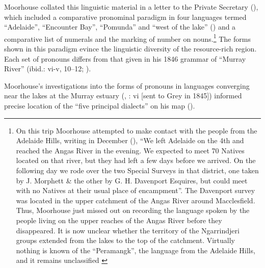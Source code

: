 Moorhouse collated this linguistic material in a letter to the Private Secretary (\citeyear{moorhouse_letter_1840}), which included a comparative pronominal paradigm in four languages termed “Adelaide'', ``Encounter Bay'', “Pomunda” and “west of the lake” () and a comparative list of numerals and the marking of number on nouns.\footnote{{On this trip Moorhouse attempted to make contact with the people from the Adelaide Hills, writing in December (\citeyear{moorhouse_letter_1840}), “We left Adelaide on the 4th and reached the Angas River in the evening. We expected to meet 70 Natives located on that river, but they had left a few days before we arrived. On the following day we rode over the two Special Surveys in that district, one taken by J. Morphett \& the other by G. H. Davenport Esquires, but could meet with no Natives at their usual place of encampment”. The Davenport survey was located in the upper catchment of the Angas River around Macclesfield. Thus, Moorhouse just missed out on recording the language spoken by the people living on the upper reaches of the Angas River before they disappeared. It is now unclear whether the territory of the Ngarrindjeri groups extended from the lakes to the top of the catchment. Virtually nothing is known of the ``Peramangk'', the language from the Adelaide Hills, and it remains unclassified \citep[170]{simpson_early_1996}}} The forms shown in this paradigm evince the linguistic diversity of the resource-rich region. Each set of pronouns differs from that given in his 1846 grammar of “Murray River” (ibid.: vi-v, 10--12; ).

Moorhouse’s investigations into the forms of pronouns in languages converging near the lakes at the Murray estuary (\citeyear{moorhouse_letter_1840}, \citeyear{moorhouse_vocabulary_1846}: vi [sent to Grey in 1845]) informed  precise location of the “five principal dialects” on his map ().


